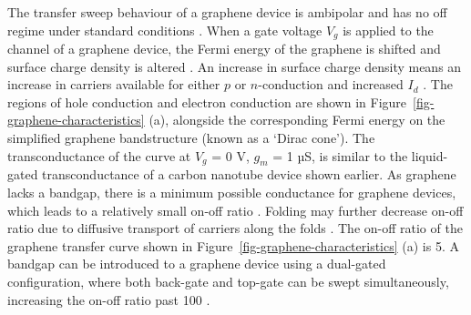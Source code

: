 \documentclass[
  a4paper,
]{scrbook}
\begin{document}
The transfer sweep behaviour of a graphene device is ambipolar and has
no off regime under standard conditions
\autocite{Novoselov2004,Bartolomeo2011,Ohno2015}. When a gate voltage
\(V_g\) is applied to the channel of a graphene device, the Fermi energy
of the graphene is shifted and surface charge density is altered
\autocite{Novoselov2004,Heller2010,Ohno2015}. An increase in surface
charge density means an increase in carriers available for either \(p\)
or \(n\)-conduction and increased \(I_d\) \autocite{Geim2007}. The
regions of hole conduction and electron conduction are shown in
Figure~\ref{fig-graphene-characteristics} (a), alongside the
corresponding Fermi energy on the simplified graphene bandstructure
(known as a `Dirac cone'). The transconductance of the curve at \(V_g\)
= 0 V, \(g_m\) = 1 µS, is similar to the liquid-gated transconductance
of a carbon nanotube device shown earlier. As graphene lacks a bandgap,
there is a minimum possible conductance for graphene devices, which
leads to a relatively small on-off ratio
\autocite{Novoselov2004,Geim2007}. Folding may further decrease on-off
ratio due to diffusive transport of carriers along the folds
\autocite{Zhu2012}. The on-off ratio of the graphene transfer curve
shown in Figure~\ref{fig-graphene-characteristics} (a) is 5. A bandgap
can be introduced to a graphene device using a dual-gated configuration,
where both back-gate and top-gate can be swept simultaneously,
increasing the on-off ratio past 100
\autocite{Xia2010,Ahn2020,Shkodra2021}.
\end{document}
